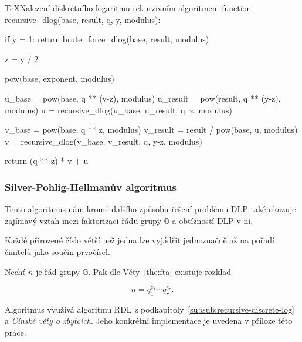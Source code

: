 \documentclass[
  program=infoi,
  biblatex,
  figures=false,
  glossaries,
  index
]{kidiplom}
\begin{document}
            \begin{kicode}{TeX}{}{Nalezení diskrétního logaritmu rekurzivním algoritmem}
                function recursive_dlog(base, result, q, y, modulus):

                    if y = 1:
                        return brute_force_dlog(base, result, modulus)

                    z = y / 2

                    pow(base, exponent, modulus)

                    u_base = pow(base, q ** (y-z), modulus)
                    u_result = pow(result, q ** (y-z), modulus)
                    u = recursive_dlog(u_base, u_result, q, z, modulus)


                    v_base = pow(base, q ** z, modulus)
                    v_result = result / pow(base, u, modulus)
                    v = recursive_dlog(v_base, v_result, q, y-z, modulus)
            
                    return (q ** z) * v + u
            \end{kicode}


        \subsubsection{Silver-Pohlig-Hellmanův algoritmus}\label{subsub:silver-pohlig-hellman}

            Tento algoritmus nám kromě dalšího způsobu řešení problému DLP také ukazuje zajímavý vztah mezi 
            faktorizací řádu grupy $\mathbb{G}$ a obtížností DLP v ní.            

            \begin{theorem}\label{the:fta}
                Každé přirozené číslo větší než jedna lze vyjádřit jednoznačně
                až na pořadí činitelů jako součin prvočísel.
            \end{theorem}

            Nechť $n$ je řád grupy $\mathbb{G}$. Pak dle Věty~\ref{the:fta} existuje rozklad

                \begin{equation}\label{eq:factorization}
                    n=q_1^{e_1} \cdots q_r^{e_r}.
                \end{equation}

            Algoritmus využívá algoritmu RDL z podkapitoly~\ref{subsub:recursive-discrete-log} a \emph{Čínské věty o zbytcích}.
            Jeho konkrétní implementace je uvedena v příloze této práce.
\end{document}
